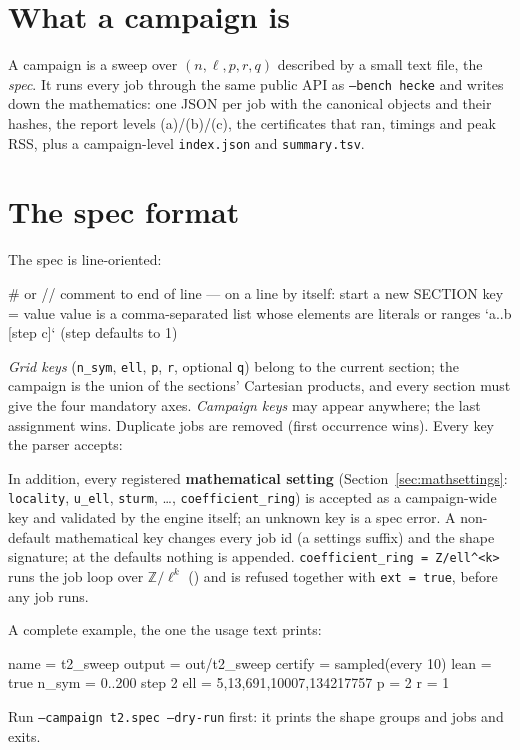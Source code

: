 \documentclass[11pt,openany]{report}
\newcommand{\Z}{\mathbb{Z}}
\newcommand{\Ecite}[1]{{\ttfamily[E,~#1]}}
\newcommand{\cli}[1]{\texttt{#1}}
\newcommand{\file}[1]{\nolinkurl{#1}}
\newcommand{\vb}[1]{\texttt{#1}}
\begin{document}
\section{What a campaign is}\label{sec:campaign}

A campaign is a sweep over $(n,\ell,p,r,q)$ described by a small text file, the \emph{spec}. It runs
every job through the same public API as \cli{--bench hecke} and writes down the mathematics: one JSON
per job with the canonical objects and their hashes, the report levels (a)/(b)/(c), the certificates
that ran, timings and peak RSS, plus a campaign-level \file{index.json} and \file{summary.tsv}.




\section{The spec format}\label{sec:spec}

The spec is line-oriented:
\begin{spec}
# or //          comment to end of line
---              on a line by itself: start a new SECTION
key = value      value is a comma-separated list whose elements are literals
                 or ranges `a..b [step c]` (step defaults to 1)
\end{spec}
\emph{Grid keys} (\vb{n\_sym}, \vb{ell}, \vb{p}, \vb{r}, optional \vb{q}) belong to the current section;
the campaign is the union of the sections' Cartesian products, and every section must give the four
mandatory axes. \emph{Campaign keys} may appear anywhere; the last assignment wins. Duplicate jobs are
removed (first occurrence wins). Every key the parser accepts:



In addition, every registered \textbf{mathematical setting} (Section~\ref{sec:mathsettings}:
\vb{locality}, \vb{u\_ell}, \vb{sturm}, \dots, \vb{coefficient\_ring}) is accepted as a campaign-wide
key and validated by the engine itself; an unknown key is a spec error. A non-default mathematical key
changes every job id (a settings suffix) and the shape signature; at the defaults nothing is appended.
\vb{coefficient\_ring = Z/ell\^{}<k>} runs the job loop over $\Z/\ell^k$ (\Ecite{sec:ring}) and is
refused together with \vb{ext = true}, before any job runs.

A complete example, the one the usage text prints:
\begin{spec}
name    = t2_sweep
output  = out/t2_sweep
certify = sampled(every 10)
lean    = true
n_sym   = 0..200 step 2
ell     = 5,13,691,10007,134217757
p       = 2
r       = 1
\end{spec}
Run \cli{--campaign t2.spec --dry-run} first: it prints the shape groups and jobs and exits.
\end{document}
